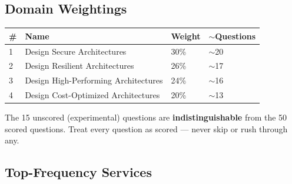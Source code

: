 \documentclass[12pt, a4paper]{article}
\begin{document}
\subsection{Domain Weightings}
\begin{comparebox}[title={Content domains}]
\begin{tabular}{@{}p{0.8cm}p{7cm}p{1.8cm}p{1.8cm}@{}}
\toprule
\textbf{\#} & \textbf{Name} & \textbf{Weight} & \textbf{$\sim$Questions} \\
\midrule
1 & Design Secure Architectures        & 30\% & $\sim$20 \\
2 & Design Resilient Architectures     & 26\% & $\sim$17 \\
3 & Design High-Performing Architectures & 24\% & $\sim$16 \\
4 & Design Cost-Optimized Architectures & 20\% & $\sim$13 \\
\bottomrule
\end{tabular}
\end{comparebox}

\begin{gotcha}[title={Common Trap}]
The 15 unscored (experimental) questions are \textbf{indistinguishable} from the 50 scored
questions. Treat every question as scored --- never skip or rush through any.
\end{gotcha}

\subsection{Top-Frequency Services}
\end{document}
